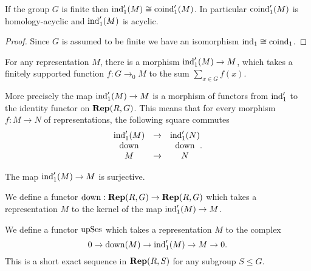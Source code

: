 \begin{corollary}	\label{cor:ind₁' iso coind₁'}
	\leanok
	If the group $G$ is finite then $\mathrm{ind}_1'(M) \cong \mathrm{coind}_1'(M)$.
	In particular $\mathrm{coind}_1'(M)$ is homology-acyclic and $\mathrm{ind}_1'(M)$ is acyclic.
\end{corollary}

\begin{proof}
	Since $G$ is assumed to be finite we have an isomorphism $\mathrm{ind}_1 \cong \mathrm{coind}_1$.
	\leanok
\end{proof}

\begin{definition} \label{def:ind₁'_π}
	For any representation $M$, there is a morphism $\mathrm{ind}_1'(M) \to M$,
	which takes a finitely supported function $f : G \to_0 M$ to the sum $\sum_{x \in G} f (x)$.
\end{definition}

\begin{lemma}	\label{lem:ind₁'_π}
	\leanok
	More precisely the map $\mathrm{ind}_1'(M) \to M$ is a morphism of functors from $\mathrm{ind}_1'$
	to the identity functor on $\mathbf{Rep}(R,G)$.
	This means that for every morphism $f : M \to N$ of representations, the following square
	commutes
	\[
		\begin{matrix}
			\mathrm{ind}_1'(M) & \to & \mathrm{ind}_1'(N) \\
			\mathrm{down} && \mathrm{down} \\
			M & \to &N
		\end{matrix}.
	\]
\end{lemma}

\begin{lemma}	\label{lem:ind₁'_π epi}
	\leanok
	The map $\mathrm{ind}_1'(M) \to M$ is surjective.
\end{lemma}


\begin{definition} \label{def:down}
	We define a functor $\mathrm{down} : \mathbf{Rep}(R,G) \to \mathbf{Rep}(R,G)$ which takes a representation
	$M$ to the kernel of the map $\mathrm{ind}_1'(M) \to M$.
\end{definition}

\begin{definition} \label{def:down ses}
	\leanok
	We define a functor $\mathrm{upSes}$ which takes a representation $M$ to the complex
	\[
		0 \to \mathrm{down}(M) \to \mathrm{ind}_1'(M) \to M \to 0.
	\]
	This is a short exact sequence in $\mathbf{Rep}(R,S)$ for any subgroup $S \le G$.
\end{definition}

